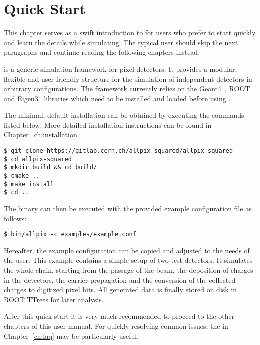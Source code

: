 \chapter{Quick Start}
\label{ch:quickstart}
This chapter serves as a swift introduction to \apsq for users who prefer to start quickly and learn the details while simulating.
The typical user should skip the next paragraphs and continue reading the following chapters instead.

\apsq is a generic simulation framework for pixel detectors.
It provides a modular, flexible and user-friendly structure for the simulation of independent detectors in arbitrary configurations.
The framework currently relies on the Geant4~\cite{geant4}, ROOT~\cite{root} and Eigen3~\cite{eigen3} libraries which need to be installed and loaded before using \apsq.

The minimal, default installation can be obtained by executing the commands listed below.
More detailed installation instructions can be found in Chapter~\ref{ch:installation}.

\begin{verbatim}
$ git clone https://gitlab.cern.ch/allpix-squared/allpix-squared
$ cd allpix-squared
$ mkdir build && cd build/
$ cmake ..
$ make install
$ cd ..
\end{verbatim}
The binary can then be executed with the provided example configuration file as follows:
\begin{verbatim}
$ bin/allpix -c examples/example.conf
\end{verbatim}

Hereafter, the example configuration can be copied and adjusted to the needs of the user.
This example contains a simple setup of two test detectors.
It simulates the whole chain, starting from the passage of the beam, the deposition of charges in the detectors, the carrier propagation and the conversion of the collected charges to digitized pixel hits.
All generated data is finally stored on disk in ROOT TTrees for later analysis.

After this quick start it is very much recommended to proceed to the other chapters of this user manual.
For quickly resolving common issues, the  in Chapter~\ref{ch:faq} may be particularly useful.
